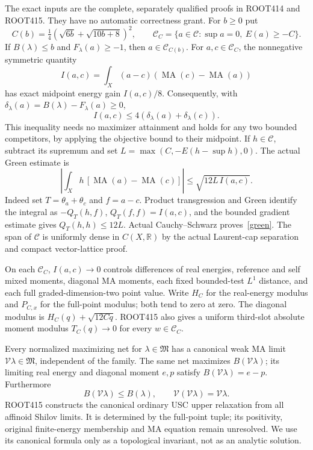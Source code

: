 \documentclass[11pt]{article}
\newcommand{\C}{\mathcal C}
\newcommand{\M}{\mathfrak M}
\newcommand{\MA}{\operatorname{MA}}
\newcommand{\V}{\mathcal V}
\newcommand{\R}{\mathbb R}
\begin{document}
The exact inputs are the complete, separately qualified proofs in
ROOT414 and ROOT415. They have no automatic correctness grant.
For $b\ge0$ put
\[
 C(b)=\tfrac14(\sqrt{6b}+\sqrt{10b+8})^2,\qquad
 \C_C=\{a\in\C:\sup a=0,\ E(a)\ge-C\}.
\]
If $B(\lambda)\le b$ and $F_\lambda(a)\ge-1$, then $a\in\C_{C(b)}$.
For $a,c\in\C_C$, the nonnegative symmetric quantity
\[
 I(a,c)=\int_X(a-c)(\MA(c)-\MA(a))
\]
has exact midpoint energy gain $I(a,c)/8$. Consequently, with
$\delta_\lambda(a)=B(\lambda)-F_\lambda(a)\ge0$,
\begin{equation}\label{mid}
 I(a,c)\le4(\delta_\lambda(a)+\delta_\lambda(c)).
\end{equation}
This inequality needs no maximizer attainment and holds for any two
bounded competitors, by applying the objective bound to their midpoint.
If $h\in\C$, subtract its supremum and set
$L=\max(C,-E(h-\sup h),0)$. The actual Green estimate is
\begin{equation}\label{green}
 \left|\int_Xh\,[\MA(a)-\MA(c)]\right|
       \le\sqrt{12L\,I(a,c)}.
\end{equation}
Indeed set $T=\theta_a+\theta_c$ and $f=a-c$. Product
transgression and Green identify the integral as $-Q_T(h,f)$,
$Q_T(f,f)=I(a,c)$, and the bounded gradient estimate gives
$Q_T(h,h)\le12L$. Actual Cauchy--Schwarz proves~\eqref{green}.
The span of $\C$ is uniformly dense in $C(X,\R)$ by the actual
Laurent-cap separation and compact vector-lattice proof.

On each $\C_C$, $I(a,c)\to0$ controls differences of real energies,
reference and self mixed moments, diagonal MA moments, each fixed
bounded-test $L^1$ distance, and each full graded-dimension-two point
value. Write $H_C$ for the real-energy modulus and
$P_{C,x}$ for the full-point modulus; both tend to zero at zero.
The diagonal modulus is $H_C(q)+\sqrt{12Cq}$.
ROOT415 also gives a uniform third-slot absolute moment modulus
$T_C(q)\to0$ for every $w\in\C_C$.

Every normalized maximizing net for $\lambda\in\M$ has a canonical
weak MA limit $\V\lambda\in\M$, independent of the family. The same
net maximizes $B(\V\lambda)$; its limiting real energy and diagonal
moment $e,p$ satisfy $B(\V\lambda)=e-p$. Furthermore
\begin{equation}\label{retr}
 B(\V\lambda)\le B(\lambda),\qquad \V(\V\lambda)=\V\lambda.
\end{equation}
ROOT415 constructs the canonical ordinary USC upper relaxation from
all affinoid Shilov limits. It is determined by the full-point tuple;
its positivity, original finite-energy membership and MA equation
remain unresolved. We use its canonical formula only as a topological
invariant, not as an analytic solution.
\end{document}
